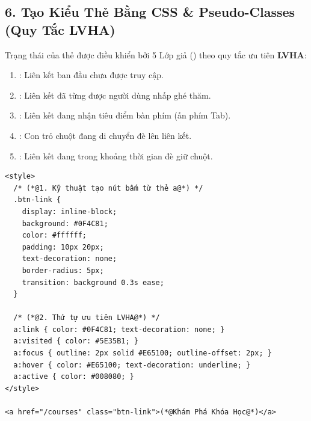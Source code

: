 \subsection{6. Tạo Kiểu Thẻ  Bằng CSS \& Pseudo-Classes (Quy Tắc LVHA)}
Trạng thái của thẻ  được điều khiển bởi 5 Lớp giả () theo quy tắc ưu tiên \textbf{LVHA}:
\begin{enumerate}
    \item {}: Liên kết ban đầu chưa được truy cập.
    \item {}: Liên kết đã từng được người dùng nhấp ghé thăm.
    \item {}: Liên kết đang nhận tiêu điểm bàn phím (ấn phím Tab).
    \item {}: Con trỏ chuột đang di chuyển đè lên liên kết.
    \item {}: Liên kết đang trong khoảng thời gian đè giữ chuột.
\end{enumerate}

\begin{codeWindow}
\begin{lstlisting}[language=HTML5]
<style>
  /* (*@1. Kỹ thuật tạo nút bấm từ thẻ a@*) */
  .btn-link {
    display: inline-block;
    background: #0F4C81;
    color: #ffffff;
    padding: 10px 20px;
    text-decoration: none;
    border-radius: 5px;
    transition: background 0.3s ease;
  }

  /* (*@2. Thứ tự ưu tiên LVHA@*) */
  a:link { color: #0F4C81; text-decoration: none; }
  a:visited { color: #5E35B1; }
  a:focus { outline: 2px solid #E65100; outline-offset: 2px; }
  a:hover { color: #E65100; text-decoration: underline; }
  a:active { color: #008080; }
</style>

<a href="/courses" class="btn-link">(*@Khám Phá Khóa Học@*)</a>
\end{lstlisting}
\end{codeWindow}

\begin{browserWindow}
\sffamily\small
{}
\end{browserWindow}


